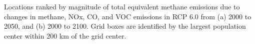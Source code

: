 Locations ranked by magnitude of total equivalent methane emissions due to changes in methane, NOx, CO, and VOC emissions in RCP 6.0 from (a) 2000 to 2050, and (b) 2000 to 2100. Grid boxes are identified by the largest population center within 200 km of the grid center.~\label{fig:eqemsrank}